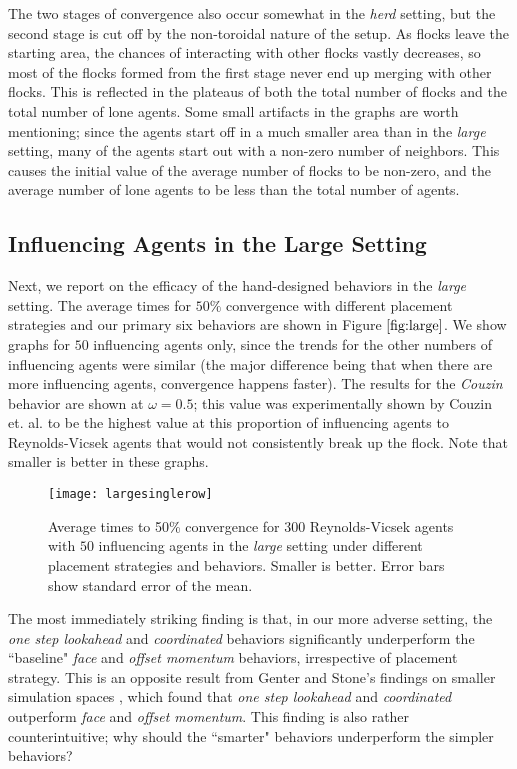 The two stages of convergence also occur somewhat in the \textit{herd} setting,
but the second stage is cut off by the non-toroidal nature of the setup.
As flocks leave the starting area, the chances of interacting with other flocks
vastly decreases, so most of the flocks formed from the first stage never end up
merging with other flocks.
This is reflected in the plateaus of both the total number of flocks and the total
number of lone agents.
Some small artifacts in the graphs are worth mentioning; since the agents start off
in a much smaller area than in the \textit{large} setting, many of the agents
start out with a non-zero number of neighbors.
This causes the initial value of the average number of flocks to be non-zero, and
the average number of lone agents to be less than the total number of agents.

\subsection{Influencing Agents in the Large Setting}

Next, we report on the efficacy of the hand-designed behaviors in the
\textit{large} setting.
The average times for $50\%$ convergence with different placement strategies
and our primary six behaviors are shown in Figure $\ref{fig:large}$.
We show graphs for $50$ influencing agents only, since the trends for the other
numbers of influencing agents were similar (the major difference being that
when there are more influencing agents, convergence happens faster).
The results for the \textit{Couzin} behavior are shown at $\omega = 0.5$; this
value was experimentally shown by Couzin et. al. to be the highest value at
this proportion of influencing agents to Reynolds-Vicsek agents that would not
consistently break up the flock.
Note that smaller is better in these graphs.
\begin{figure}
    \texttt{[image: largesinglerow]}
    \caption{Average times to 50\% convergence for $300$ Reynolds-Vicsek agents
    with $50$ influencing agents in the \textit{large} setting under different
    placement strategies and behaviors.
    Smaller is better.
    Error bars show standard error of the mean.}
    \label{fig:large}
\end{figure}

The most immediately striking finding is that, in our more adverse setting,
the \textit{one step lookahead} and \textit{coordinated} behaviors
significantly underperform the ``baseline" \textit{face} and
\textit{offset momentum} behaviors, irrespective of placement strategy.
This is an opposite result from Genter and Stone's findings on smaller simulation
spaces \cite{genter201612steplookahead, genterthesis}, which found that
\textit{one step lookahead} and \textit{coordinated} outperform \textit{face}
and \textit{offset momentum}.
This finding is also rather counterintuitive; why should the ``smarter" behaviors
underperform the simpler behaviors?

